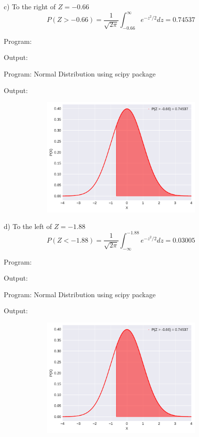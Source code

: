 \documentclass[a4paper,10pt,openright]{report}
\begin{document}
\begin{enumerate}
\begin{enumerate}
\item[c)] To the right of $Z = -0.66$
\begin{equation*}
P(Z > -0.66) = \frac{1}{\sqrt{2\pi}} \int_{-0.66}^{\infty} e^{-z^{2}/2} dz = 0.74537
\end{equation*}

\vspace{1cm}

Program:

Output:


\vspace{1cm}

Program: Normal Distribution using scipy package

Output:


\begin{figure}[ht!]
\includegraphics[width=12cm,height=6cm,keepaspectratio]{norm1c.pdf}
\centering
\end{figure}

\item[d)] To the left of $Z = -1.88$
\begin{equation*}
P(Z < -1.88) = \frac{1}{\sqrt{2\pi}} \int_{-\infty}^{-1.88} e^{-z^{2}/2} dz = 0.03005
\end{equation*}

\vspace{1cm}

Program:

Output:


\vspace{1cm}

Program: Normal Distribution using scipy package

Output:


\begin{figure}[ht!]
\includegraphics[width=12cm,height=6cm,keepaspectratio]{norm1c.pdf}
\centering
\end{figure}


\end{enumerate}
\end{enumerate}
\end{document}

